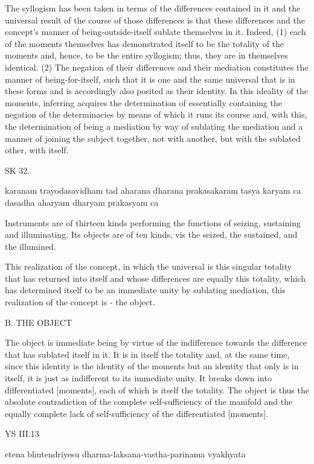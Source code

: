 The syllogism has been taken in terms of the differences contained in it
and the universal result of the course of those differences is that
these differences and the concept's manner of being-outside-itself
sublate themselves in it. Indeed,
(1) each of the moments themselves has demonstrated itself to be
the totality of the moments and, hence, to be the entire syllogism;
thus, they are in themselves identical.
(2) The negation of their differences and their mediation constitutes the
manner of being-for-itself, such that it is one and the same universal
that is in these forms and is accordingly also posited as their identity.
In this ideality of the moments, inferring acquires the determination of
essentially containing the negation of the determinacies
by means of which it runs its course and, with this,
the determination of being a mediation by way of sublating the mediation
and a manner of joining the subject together, not with another,
but with the sublated other, with itself.

SK 32.

karanam trayodasavidham tad aharana dharana prakasakaram
tasya karyam ca dasadha aharyam dharyam prakasyam ca

Instruments are of thirteen kinds performing the functions of
seizing, sustaining and illuminating.
Its objects are of ten kinds, vis
the seized, the sustained, and the illumined.

This realization of the concept, in which
the universal is this singular totality that has returned into itself
and whose differences are equally this totality,
which has determined itself to be an immediate unity by sublating mediation,
this realization of the concept is - the object.

B. THE OBJECT

The object is immediate being by virtue of
the indifference towards the difference
that has sublated itself in it.
It is in itself the totality and, at the same time,
since this identity is the identity of the moments
but an identity that only is in itself,
it is just as indifferent to its immediate unity.
It breaks down into differentiated [moments],
each of which is itself the totality.
The object is thus the absolute contradiction of
the complete self-sufficiency of the manifold and
the equally complete lack of self-sufficiency of
the differentiated [moments].

YS III.13

etena bhutendriyesu dharma-laksana-vastha-parinama vyakhyata

